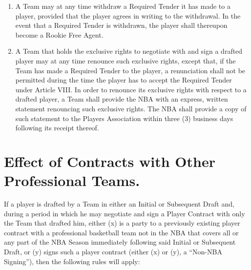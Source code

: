 \documentclass[
]{book}
\begin{document}
\begin{enumerate}
\item
  A Team may at any time withdraw a Required Tender it has made to a player, provided that the player agrees in writing to the withdrawal. In the event that a Required Tender is withdrawn, the player shall thereupon become a Rookie Free Agent.
\item
  A Team that holds the exclusive rights to negotiate with and sign a drafted player may at any time renounce such exclusive rights, except that, if the Team has made a Required Tender to the player, a renunciation shall not be permitted during the time the player has to accept the Required Tender under Article VIII. In order to renounce its exclusive rights with respect to a drafted player, a Team shall provide the NBA with an express, written statement renouncing such exclusive rights. The NBA shall provide a copy of such statement to the Players Association within three (3) business days following its receipt thereof.
\end{enumerate}

\hypertarget{effect-of-contracts-with-other-professional-teams.}{%
\section{Effect of Contracts with Other Professional Teams.}\label{effect-of-contracts-with-other-professional-teams.}}

If a player is drafted by a Team in either an Initial or Subsequent Draft and, during a period in which he may negotiate and sign a Player Contract with only the Team that drafted him, either (x) is a party to a previously existing player contract with a professional basketball team not in the NBA that covers all or any part of the NBA Season immediately following said Initial or Subsequent Draft, or (y) signs such a player contract (either (x) or (y), a ``Non-NBA Signing''), then the following rules will apply:
\end{document}
